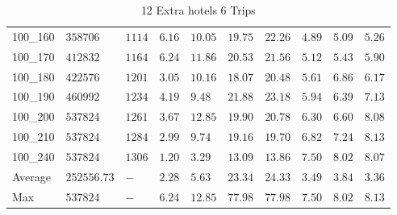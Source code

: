 \begin{center}
\begin{table}[]
\begin{adjustwidth}{-0.4in}{-1in}
\begin{tabular}{|lll|l|l|ll|lll|}
100\_160 & $358706   $ & $1114$ & $6.16$ & $10.05$  & $19.75$    & $22.26$   & $4.89$ & $5.09$   & $5.26$ \\
100\_170 & $412832   $ & $1164$ & $6.24$ & $11.86$  & $20.53$    & $21.56$   & $5.12$ & $5.43$   & $5.90$ \\
100\_180 & $422576   $ & $1201$ & $3.05$ & $10.16$  & $18.07$    & $20.48$   & $5.61$ & $6.86$   & $6.17$ \\
100\_190 & $460992   $ & $1234$ & $4.19$ & $9.48 $  & $21.88$    & $23.18$   & $5.94$ & $6.39$   & $7.13$ \\
100\_200 & $537824   $ & $1261$ & $3.67$ & $12.85$  & $19.90$    & $20.78$   & $6.30$ & $6.60$   & $8.08$ \\
100\_210 & $537824   $ & $1284$ & $2.99$ & $9.74 $  & $19.16$    & $19.70$   & $6.82$ & $7.24$   & $8.13$ \\
100\_240 & $537824   $ & $1306$ & $1.20$ & $3.29 $  & $13.09$    & $13.86$   & $7.50$ & $8.02$   & $8.07$ \\
\hline
Average  & $252556.73$ & $-   $ & $2.28$ & $5.63 $  & $23.34$    & $24.33$   & $3.49$ & $3.84$   & $3.36$ \\
Max      & $537824   $ & $-   $ & $6.24$ & $12.85$  & $77.98$    & $77.98$   & $7.50$ & $8.02$   & $8.13$ \\
\hline
\end{tabular}
    \end{adjustwidth}
    \caption{12 Extra hotels 6 Trips}
    \label{12-6}
    \end{table}
\end{center}
